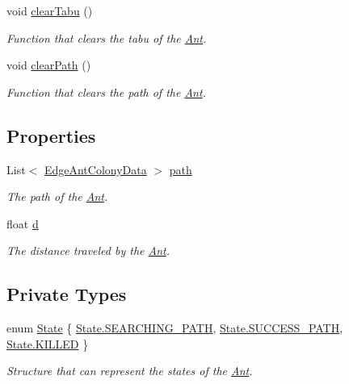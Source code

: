 \begin{DoxyCompactItemize}
void \hyperlink{classAnt_a60c03789bb0cb0190595b64f455c8e31}{clear\+Tabu} ()
\begin{DoxyCompactList}\small\item\em Function that clears the tabu of the \hyperlink{classAnt}{Ant}. \end{DoxyCompactList}\item 
void \hyperlink{classAnt_a4797a8a8f9555b6cb7043692120081d4}{clear\+Path} ()
\begin{DoxyCompactList}\small\item\em Function that clears the path of the \hyperlink{classAnt}{Ant}. \end{DoxyCompactList}\end{DoxyCompactItemize}
\subsection*{Properties}
\begin{DoxyCompactItemize}
\item 
List$<$ \hyperlink{classEdgeAntColonyData}{Edge\+Ant\+Colony\+Data} $>$ \hyperlink{classAnt_ac13c32bfaeb44ea90f08a84ee10c4ccf}{path}
\begin{DoxyCompactList}\small\item\em The path of the \hyperlink{classAnt}{Ant}.\end{DoxyCompactList}\item 
float \hyperlink{classAnt_a9102aaa24cee957d2c82b710c337c591}{d}
\begin{DoxyCompactList}\small\item\em The distance traveled by the \hyperlink{classAnt}{Ant}.\end{DoxyCompactList}\end{DoxyCompactItemize}
\subsection*{Private Types}
\begin{DoxyCompactItemize}
\item 
enum \hyperlink{classAnt_aead9977653848889b0d5e07a50602de6}{State} \{ \hyperlink{classAnt_aead9977653848889b0d5e07a50602de6a2ed3540e99b77a1a89434d1cf1ec4da8}{State.\+S\+E\+A\+R\+C\+H\+I\+N\+G\+\_\+\+P\+A\+TH}, 
\hyperlink{classAnt_aead9977653848889b0d5e07a50602de6a01c8e9e14d7c650900c0ca10938c0e02}{State.\+S\+U\+C\+C\+E\+S\+S\+\_\+\+P\+A\+TH}, 
\hyperlink{classAnt_aead9977653848889b0d5e07a50602de6a4d216b2c8ca203bbd08ff87244bf565c}{State.\+K\+I\+L\+L\+ED}
 \}\begin{DoxyCompactList}\small\item\em Structure that can represent the states of the \hyperlink{classAnt}{Ant}. \end{DoxyCompactList}
\end{DoxyCompactItemize}
